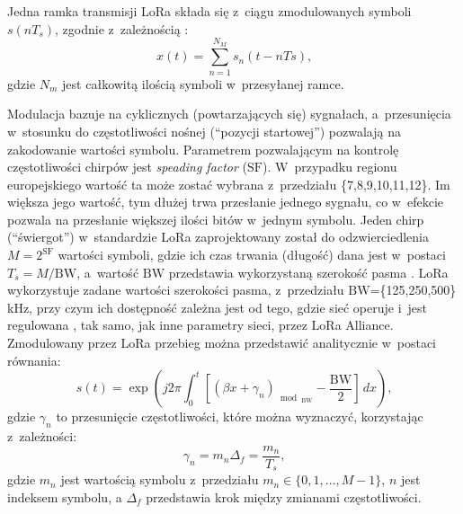 Jedna ramka transmisji LoRa składa się z~ciągu zmodulowanych symboli $s(nT_s)$, zgodnie z~zależnością
\cite{lora-modulation-fscm,lora-emulator}:
\begin{equation}
    x(t) = \sum_{n=1}^{N_M} s_n(t-nTs)\text{,}
\end{equation}
gdzie $N_m$ jest całkowitą ilością symboli w~przesyłanej ramce.

Modulacja bazuje na cyklicznych (powtarzających się) sygnałach, a~przesunięcia w~stosunku do częstotliwości nośnej
(\enquote{pozycji startowej}) pozwalają na zakodowanie wartości symbolu. Parametrem pozwalającym na kontrolę
częstotliwości chirpów jest \textsl{speading factor} ($\mathrm{SF}$). W~przypadku regionu europejskiego wartość ta może
zostać wybrana z~przedziału \{7,8,9,10,11,12\}. Im większa jego wartość, tym dłużej trwa przesłanie jednego sygnału, co
w~efekcie pozwala na przesłanie większej ilości bitów w~jednym symbolu. Jeden chirp (\enquote{świergot}) w~standardzie
LoRa zaprojektowany został do odzwierciedlenia $M=2^{\mathrm{SF}}$ wartości symboli, gdzie ich czas trwania (długość)
dana jest w~postaci $T_s=M/\mathrm{BW}$, a~wartość $\mathrm{BW}$ przedstawia wykorzystaną szerokość pasma
\cite{lora-modulation-fscm}. LoRa wykorzystuje zadane wartości szerokości pasma, z~przedziału
$\mathrm{BW}$=\{125,250,500\} kHz, przy czym ich dostępność zależna jest od tego, gdzie sieć operuje i~jest regulowana
\cite{lora-regional-parameters}, tak samo, jak inne parametry sieci, przez LoRa Alliance. Zmodulowany przez LoRa
przebieg można przedstawić analitycznie \cite{lora-emulator} w~postaci równania:
\begin{equation}\label{eqn:lora-waveform}
    s(t) = \exp{\left({j}2\pi\int_{0}^{t}\left[(\beta x+\gamma_n)_{\bmod{_{\mathrm{BW}}}}-\frac{\mathrm{BW}}{2}\right]\,dx\right)}\text{,}
\end{equation}
gdzie $\gamma_n$ to przesunięcie częstotliwości, które można wyznaczyć, korzystając z~zależności:
\begin{equation}
    \gamma_n = m_n\Delta_f = \frac{m_n}{T_s}\text{,}
\end{equation}
gdzie $m_n$ jest wartością symbolu z~przedziału $m_n\in\{0,1,\ldots,M-1\}$, $n$ jest indeksem symbolu, a $\Delta_f$
przedstawia krok między zmianami częstotliwości.

